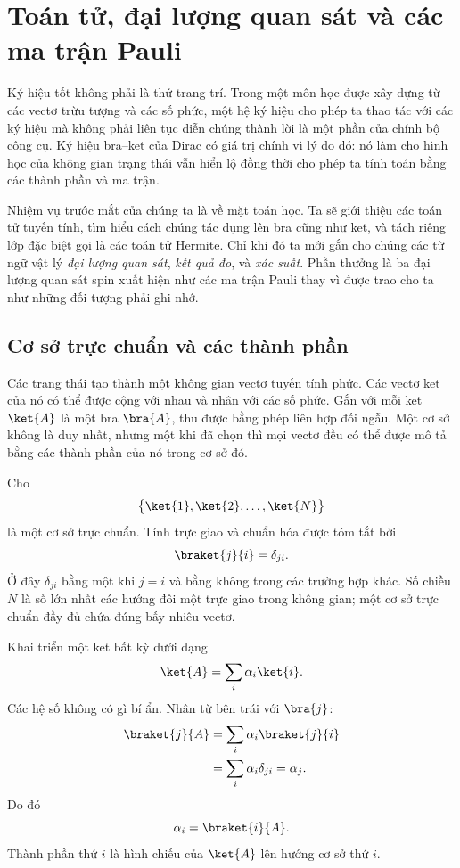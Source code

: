 \chapter{Toán tử, đại lượng quan sát và các ma trận Pauli}

Ký hiệu tốt không phải là thứ trang trí. Trong một môn học được xây dựng từ các vectơ trừu tượng và các số phức, một hệ ký hiệu cho phép ta thao tác với các ký hiệu mà không phải liên tục diễn chúng thành lời là một phần của chính bộ công cụ. Ký hiệu bra--ket của Dirac có giá trị chính vì lý do đó: nó làm cho hình học của không gian trạng thái vẫn hiển lộ đồng thời cho phép ta tính toán bằng các thành phần và ma trận.

Nhiệm vụ trước mắt của chúng ta là về mặt toán học. Ta sẽ giới thiệu các toán tử tuyến tính, tìm hiểu cách chúng tác dụng lên bra cũng như ket, và tách riêng lớp đặc biệt gọi là các toán tử Hermite. Chỉ khi đó ta mới gắn cho chúng các từ ngữ vật lý \emph{đại lượng quan sát}, \emph{kết quả đo}, và \emph{xác suất}. Phần thưởng là ba đại lượng quan sát spin xuất hiện như các ma trận Pauli thay vì được trao cho ta như những đối tượng phải ghi nhớ.

\section{Cơ sở trực chuẩn và các thành phần}

Các trạng thái tạo thành một không gian vectơ tuyến tính phức. Các vectơ ket của nó có thể được cộng với nhau và nhân với các số phức. Gắn với mỗi ket \(\ket{A}\) là một bra \(\bra{A}\), thu được bằng phép liên hợp đối ngẫu. Một cơ sở không là duy nhất, nhưng một khi đã chọn thì mọi vectơ đều có thể được mô tả bằng các thành phần của nó trong cơ sở đó.

Cho
\[
\bigl\{\ket{1},\ket{2},\ldots,\ket{N}\bigr\}
\]
là một cơ sở trực chuẩn. Tính trực giao và chuẩn hóa được tóm tắt bởi
\begin{equation}
\braket{j}{i}=\delta_{ji}.
\label{eq:orthonormal-basis}
\end{equation}
Ở đây \(\delta_{ji}\) bằng một khi \(j=i\) và bằng không trong các trường hợp khác. Số chiều \(N\) là số lớn nhất các hướng đôi một trực giao trong không gian; một cơ sở trực chuẩn đầy đủ chứa đúng bấy nhiêu vectơ.

Khai triển một ket bất kỳ dưới dạng
\begin{equation}
\ket{A}=\sum_i \alpha_i\ket{i}.
\label{eq:ket-expansion}
\end{equation}
Các hệ số không có gì bí ẩn. Nhân từ bên trái với \(\bra{j}\):
\begin{align}
\braket{j}{A}
 &=\sum_i\alpha_i\braket{j}{i} \\
 &=\sum_i\alpha_i\delta_{ji}
 =\alpha_j.
\end{align}
Do đó
\begin{equation}
\alpha_i=\braket{i}{A}.
\label{eq:components-inner-products}
\end{equation}
Thành phần thứ \(i\) là hình chiếu của \(\ket{A}\) lên hướng cơ sở thứ \(i\).

